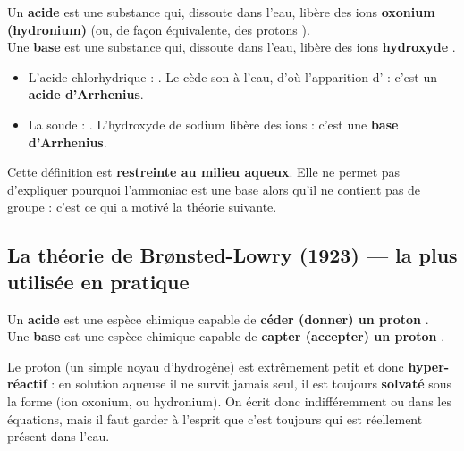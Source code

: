 \documentclass[11pt,a4paper]{article}
\begin{document}
\begin{definition}
Un \textbf{acide} est une substance qui, dissoute dans l'eau, libère des ions \textbf{oxonium (hydronium)}
 (ou, de façon équivalente, des protons ). \\
Une \textbf{base} est une substance qui, dissoute dans l'eau, libère des ions \textbf{hydroxyde} .
\end{definition}

\begin{exemple}
\begin{itemize}[leftmargin=1.6em,topsep=2pt,itemsep=2pt]
  \item L'acide chlorhydrique : . Le  cède son  à l'eau, d'où
        l'apparition d' : c'est un \textbf{acide d'Arrhenius}.
  \item La soude : . L'hydroxyde de sodium libère des ions  : c'est une
        \textbf{base d'Arrhenius}.
\end{itemize}
\end{exemple}

\begin{remarque}
Cette définition est \textbf{restreinte au milieu aqueux}. Elle ne permet pas d'expliquer pourquoi
l'ammoniac  est une base alors qu'il ne contient pas de groupe  : c'est ce qui a motivé
la théorie suivante.
\end{remarque}

\subsection{La théorie de Brønsted-Lowry (1923) --- la plus utilisée en pratique}

\begin{definition}
Un \textbf{acide} est une espèce chimique capable de \textbf{céder (donner) un proton} . \\
Une \textbf{base} est une espèce chimique capable de \textbf{capter (accepter) un proton} .
\end{definition}

\begin{attention}
Le proton  (un simple noyau d'hydrogène) est extrêmement petit et donc \textbf{hyper-réactif} : en
solution aqueuse il ne survit jamais seul, il est toujours \textbf{solvaté} sous la forme  (ion
oxonium, ou hydronium). On écrit donc indifféremment  ou  dans les équations, mais il faut
garder à l'esprit que c'est toujours  qui est réellement présent dans l'eau.
\end{attention}
\end{document}
